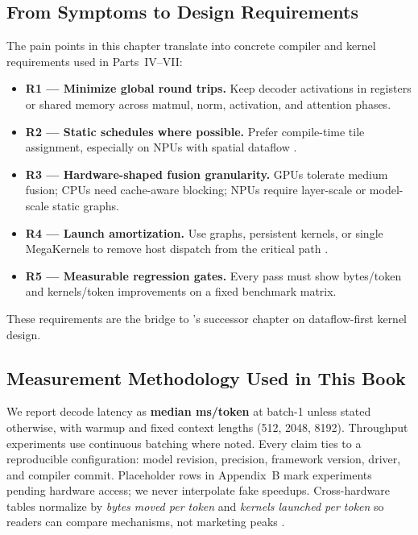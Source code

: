 \subsection{From Symptoms to Design Requirements}
\label{sec:design_requirements}

The pain points in this chapter translate into concrete compiler and kernel requirements used in Parts~IV--VII:
\begin{itemize}
\item \textbf{R1 --- Minimize global round trips.} Keep decoder activations in registers or shared memory across matmul, norm, activation, and attention phases.
\item \textbf{R2 --- Static schedules where possible.} Prefer compile-time tile assignment, especially on NPUs with spatial dataflow \citep{amd2024xdna}.
\item \textbf{R3 --- Hardware-shaped fusion granularity.} GPUs tolerate medium fusion; CPUs need cache-aware blocking; NPUs require layer-scale or model-scale static graphs.
\item \textbf{R4 --- Launch amortization.} Use graphs, persistent kernels, or single MegaKernels to remove host dispatch from the critical path \citep{taxbreak2026,memoryfloor2026}.
\item \textbf{R5 --- Measurable regression gates.} Every pass must show bytes/token and kernels/token improvements on a fixed benchmark matrix.
\end{itemize}
These requirements are the bridge to 's successor chapter on dataflow-first kernel design.

\subsection{Measurement Methodology Used in This Book}
\label{sec:measure_method}

We report decode latency as \textbf{median ms/token} at batch-1 unless stated otherwise, with warmup and fixed context lengths (512, 2048, 8192).
Throughput experiments use continuous batching where noted.
Every claim ties to a reproducible configuration: model revision, precision, framework version, driver, and compiler commit.
Placeholder rows in Appendix~B mark experiments pending hardware access; we never interpolate fake speedups.
Cross-hardware tables normalize by \emph{bytes moved per token} and \emph{kernels launched per token} so readers can compare mechanisms, not marketing peaks \citep{taxbreak2026,memoryfloor2026}.


